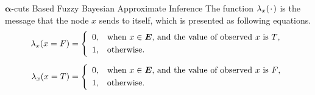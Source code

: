 \begin{frame}{$\bm{\alpha}$-cuts Based Fuzzy Bayesian Approximate Inference}
    The function $\lambda_{x}(\hspace{1pt}\cdot\hspace{1pt})$ is the message that the node $x$ sends to itself, which is presented as following equations.
    \begin{align*}
      \lambda_{x}{(x = F)} &=
        \left\{\begin{array}{ll}
        0, & \text{when $x \in \bm{E}$, and the value of observed $x$ \text is $T$,}\\[3pt]
        1, & \text{otherwise.}
        \end{array}\right.\\[5pt]
      \lambda_{x}{(x = T)} &=
        \left\{\begin{array}{ll}
        0, & \text{when $x \in \bm{E}$, and the value of observed $x$ \text is $F$,}\\[3pt]
        1, & \text{otherwise.}
        \end{array}\right.
    \end{align*}
\end{frame}

